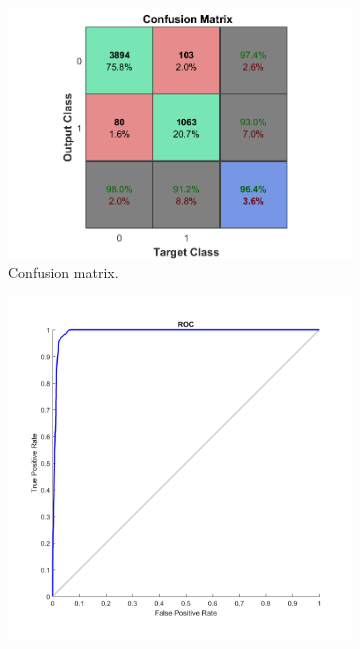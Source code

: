 \documentclass[a4paper, 11pt]{article}
\begin{document}
\begin{figure}[h!]
    \centering
    \begin{subfigure}[t]{0.32\textwidth}
        \includegraphics[width=\textwidth]{../figures/final/confmat.png}
        \caption{Confusion matrix.}
        \label{fig:confmat}
    \end{subfigure}
    \hfill %
    \begin{subfigure}[t]{0.32\textwidth}
        \includegraphics[width=\textwidth]{../figures/final/roc.png}

\end{subfigure}
\end{figure}
\end{document}
